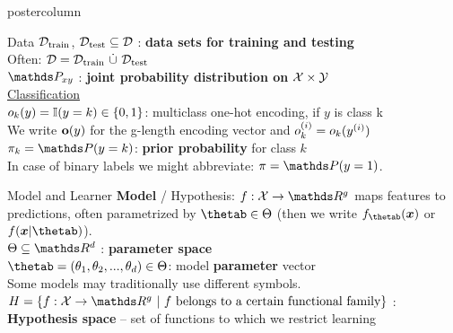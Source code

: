\documentclass{beamer}
\begin{document}
\begin{frame}[fragile]{}
\begin{columns}
\begin{column}{.31\textwidth}
\begin{beamercolorbox}[center]{postercolumn}
\begin{minipage}{.98\textwidth}
{\begin{myblock}{Data}
$\mathcal{D}_{\text{train}}$, $\mathcal{D}_{\text{test}} \subseteq \mathcal{D}$ : \textbf{data sets for training and testing} \\ 
Often: $\mathcal{D} = \mathcal{D}_{\text{train}} ~ \dot{\cup} ~ \mathcal{D}_{\text{test}}$\\
 

$\P_{xy}$ : \textbf{joint probability distribution on} $\mathcal{X} \times \mathcal{Y}$ \\


\underline{Classification}\\

$o_k(y) = \mathbb{I}(y = k) \in \{0,1\}$: multiclass one-hot encoding, if $y$ is class k\\ 
We write $\bold{o}(y)$ for the g-length encoding vector and $o_k^{(i)} =  o_k(y^{(i)})$\\

$\pi_k = \P(y = k)$:\textbf{ prior probability} for class $k$ \\
In case of binary labels we might abbreviate: $\pi = \P(y = 1)$.
  
\end{myblock}
\begin{myblock}{Model and Learner}
    \textbf{Model} / Hypothesis: $f : \Xspace \rightarrow \R^g$ maps features to predictions, often parametrized by $\thetab \in \Theta$ (then we write $f_{\thetab}(\xv)$ or $f(\xv | \thetab)$). \\


$\Theta \subseteq \R^d$ : \textbf{parameter space} \\
  
$\thetab = (\theta_1, \theta_2, ..., \theta_d) \in \Theta$: model \textbf{parameter} vector\\
Some models may traditionally use different symbols. \\

$\Hspace = \{f : \Xspace \rightarrow \R^g ~|~ f \text{ belongs to a certain functional family}\}$ : \\ \textbf{Hypothesis space} -- set of functions to which we restrict learning
				

\end{myblock}}
\end{minipage}
\end{beamercolorbox}
\end{column}
\end{columns}
\end{frame}
\end{document}
